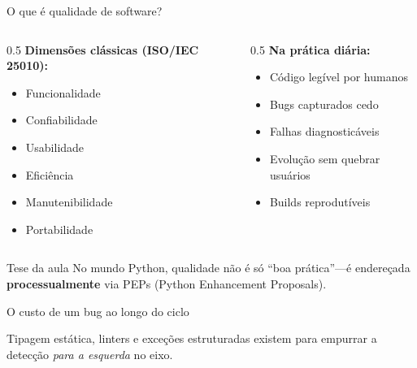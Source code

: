 \documentclass[aspectratio=169]{beamer}
\begin{document}
\begin{frame}[shrink=5]{O que é qualidade de software?}
  \begin{columns}[T]
    \begin{column}{0.5\textwidth}
      \textbf{Dimensões clássicas (ISO/IEC 25010):}
      \begin{itemize}
        \item Funcionalidade
        \item Confiabilidade
        \item Usabilidade
        \item Eficiência
        \item Manutenibilidade
        \item Portabilidade
      \end{itemize}
    \end{column}
    \begin{column}{0.5\textwidth}
      \textbf{Na prática diária:}
      \begin{itemize}
        \item Código legível por humanos
        \item Bugs capturados cedo
        \item Falhas diagnosticáveis
        \item Evolução sem quebrar usuários
        \item Builds reprodutíveis
      \end{itemize}
    \end{column}
  \end{columns}
  \begin{exampleblock}{Tese da aula}
    No mundo Python, qualidade não é só ``boa prática''---é endereçada
    \textbf{processualmente} via PEPs (Python Enhancement Proposals).
  \end{exampleblock}
\end{frame}

\begin{frame}[shrink=12]{O custo de um bug ao longo do ciclo}
  \begin{center}
  \end{center}
  \footnotesize Tipagem estática, linters e exceções estruturadas existem para
  empurrar a detecção \emph{para a esquerda} no eixo.
\end{frame}
\end{document}
